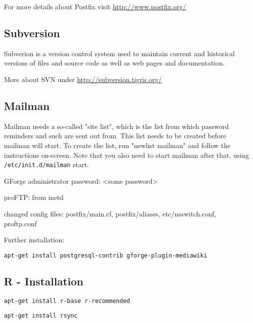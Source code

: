 \documentclass[a4paper]{article}
\let\code=\texttt
\newcommand{\proglang}[1]{\textsf{#1}}
\begin{document}
For more details about Postfix visit \url{http://www.postfix.org/}

\subsection{Subversion}

Subverion is a version control system used to maintain current and
historical versions of files and source code as well as web pages and
documentation.
\par More about SVN under \url{http://subversion.tigris.org/}

\subsection{Mailman}
Mailman needs a so-called "site list", which is the list from
which password reminders and such are sent out from.  This list
needs to be created before mailman will start. To create
the list, run "newlist mailman" and follow the instructions on-screen.
Note that you also need to start mailman after that, using
\code{/etc/init.d/mailman} start.

GForge administrator password: <some password>

proFTP: from inetd

changed config files: postfix/main.cf, postfix/aliases, etc/nsswitch.conf, proftp.conf
\par
Further installation: 
\begin{lstlisting}[frame=single, framerule=0.95pt]
apt-get install postgresql-contrib gforge-plugin-mediawiki
\end{lstlisting}


\subsection{\proglang{R} - Installation}

\begin{lstlisting}[frame=single, framerule=0.95pt]
apt-get install r-base r-recommended
\end{lstlisting}


\begin{lstlisting}[frame=single, framerule=0.95pt]
apt-get install rsync
\end{lstlisting}
\end{document}
